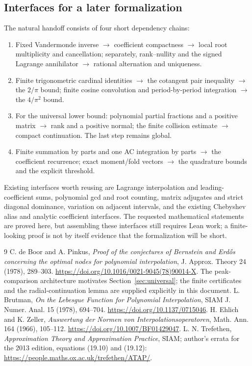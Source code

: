\documentclass[11pt]{article}
\theoremstyle{remark}\newtheorem{remark}[theorem]{Remark}
\begin{document}
\subsection{Interfaces for a later formalization}
The natural handoff consists of four short dependency chains:
\begin{enumerate}
\item Fixed Vandermonde inverse $\to$ coefficient compactness $\to$ local
root multiplicity and cancellation; separately, rank--nullity and the
signed Lagrange annihilator $\to$ rational alternation and uniqueness.
\item Finite trigonometric cardinal identities $\to$ the cotangent
pair inequality $\to$ the $2/\pi$ bound; finite cosine convolution and
period-by-period integration $\to$ the $4/\pi^2$ bound.
\item For the universal lower bound: polynomial partial fractions and
a positive matrix $\to$ rank and a positive normal; the finite collision
estimate $\to$ compact continuation. The last step remains global.
\item Finite summation by parts and one AC integration by parts $\to$
the coefficient recurrence; exact moment/fold vectors $\to$ the quadrature
bounds and the explicit threshold.
\end{enumerate}
Existing interfaces worth reusing are Lagrange interpolation and
leading-coefficient sums, polynomial gcd and root counting, matrix
adjugates and strict diagonal dominance, variation on adjacent intervals,
and the existing Chebyshev alias and analytic coefficient interfaces.
The requested mathematical statements are proved here, but assembling
these interfaces still requires Lean work; a finite-looking proof is
not by itself evidence that the formalization will be short.

\begin{thebibliography}{9}
 C. de Boor and A. Pinkus,
\emph{Proof of the conjectures of Bernstein and Erd\H{o}s concerning the
optimal nodes for polynomial interpolation}, J. Approx. Theory 24 (1978),
289--303. \url{https://doi.org/10.1016/0021-9045(78)90014-X}.
The peak-comparison architecture motivates Section~\ref{sec:universal};
the finite certificates and the radial-continuation lemma are supplied
explicitly in this document.
 L. Brutman, \emph{On the Lebesgue Function for Polynomial
Interpolation}, SIAM J. Numer. Anal. 15 (1978), 694--704.
\url{https://doi.org/10.1137/0715046}.
 H. Ehlich and K. Zeller, \emph{Auswertung der Normen von
Interpolationsoperatoren}, Math. Ann. 164 (1966), 105--112.
\url{https://doi.org/10.1007/BF01429047}.
 L. N. Trefethen, \emph{Approximation Theory and Approximation
Practice}, SIAM; author's errata for the 2013 edition, equations (19.10)
and (19.12): \url{https://people.maths.ox.ac.uk/trefethen/ATAP/}.
\end{thebibliography}
\end{document}
